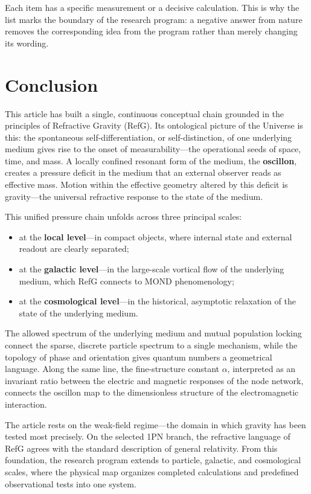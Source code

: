\documentclass[11pt,a4paper]{article}
\begin{document}
Each item has a specific measurement or a decisive calculation. This is why the list marks the boundary of the research program: a negative answer from nature removes the corresponding idea from the program rather than merely changing its wording.

\section*{Conclusion}

This article has built a single, continuous conceptual chain grounded in the principles of Refractive Gravity (RefG). Its ontological picture of the Universe is this: the spontaneous self-differentiation, or self-distinction, of one underlying medium gives rise to the onset of measurability---the operational seeds of space, time, and mass. A locally confined resonant form of the medium, the \textbf{oscillon}, creates a pressure deficit in the medium that an external observer reads as effective mass. Motion within the effective geometry altered by this deficit is gravity---the universal refractive response to the state of the medium.

This unified pressure chain unfolds across three principal scales:

\begin{itemize}
\item at the \textbf{local level}---in compact objects, where internal state and external readout are clearly separated;
\item at the \textbf{galactic level}---in the large-scale vortical flow of the underlying medium, which RefG connects to MOND phenomenology;
\item at the \textbf{cosmological level}---in the historical, asymptotic relaxation of the state of the underlying medium.
\end{itemize}

The allowed spectrum of the underlying medium and mutual population locking connect the sparse, discrete particle spectrum to a single mechanism, while the topology of phase and orientation gives quantum numbers a geometrical language. Along the same line, the fine-structure constant $\alpha$, interpreted as an invariant ratio between the electric and magnetic responses of the node network, connects the oscillon map to the dimensionless structure of the electromagnetic interaction.

The article rests on the weak-field regime---the domain in which gravity has been tested most precisely. On the selected 1PN branch, the refractive language of RefG agrees with the standard description of general relativity. From this foundation, the research program extends to particle, galactic, and cosmological scales, where the physical map organizes completed calculations and predefined observational tests into one system.
\end{document}
